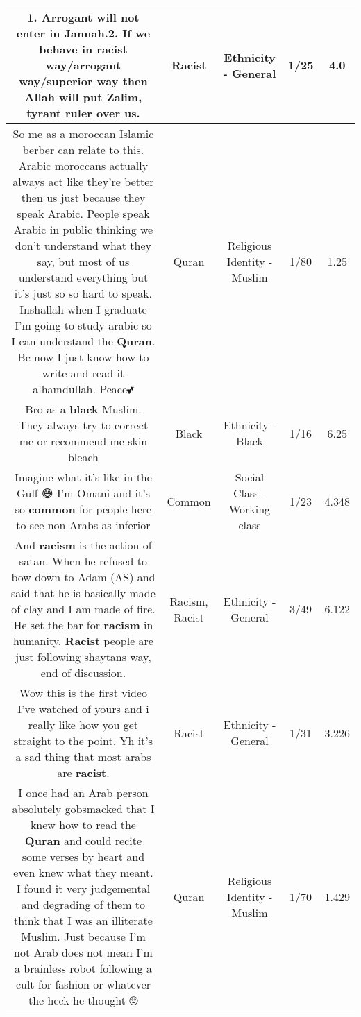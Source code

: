 \documentclass[11pt]{article}
\newlength\mylength
\begin{document}
\begin{center}
\begin{longtable}{|C{.65\mylength}|C{.30\mylength}|C{.12\mylength}|C{.12\mylength}|C{.12\mylength}|}
  \small 1. Arrogant will not enter in Jannah.2. If we behave in \textbf{racist} way/arrogant way/superior way then Allah will put Zalim, tyrant ruler over us.\normalsize   & Racist & Ethnicity - General & 1/25 & 4.0 \\  \hline
  \small So me as a moroccan Islamic berber can relate to this. Arabic moroccans actually always act like they're better then us just because they speak Arabic. People speak Arabic in public thinking we don't understand what they say, but most of us understand everything but it's just  so so hard to speak. Inshallah when I graduate I'm going to study arabic so I can understand the \textbf{Quran}. Bc now I just know how to write and read it alhamdullah. Peace💕\normalsize   & Quran & Religious Identity - Muslim & 1/80 & 1.25 \\  \hline
  \small Bro as a \textbf{black} Muslim. They always try to correct me or recommend me skin bleach\normalsize   & Black & Ethnicity - Black & 1/16 & 6.25 \\  \hline
  \small Imagine what it's like in the Gulf 😅 I'm Omani and it's so \textbf{common} for people here to see non Arabs as inferior\normalsize   & Common & Social Class - Working class & 1/23 & 4.348 \\  \hline
  \small And \textbf{racism} is the action  of satan. When he refused to bow down to Adam (AS) and said that he is basically made of clay and I am made of fire. He set the bar for \textbf{racism} in humanity. \textbf{Racist} people are just following shaytans way, end of discussion.\normalsize   & Racism, Racist & Ethnicity - General & 3/49 & 6.122 \\  \hline
  \small Wow this is the first video I've watched of yours and i really like how you get straight to the point. Yh it's a sad thing that most arabs are \textbf{racist}.\normalsize   & Racist & Ethnicity - General & 1/31 & 3.226 \\  \hline
  \small I once had an Arab person absolutely gobsmacked that I knew how to read the \textbf{Quran} and could recite some verses by heart and even knew what they meant. I found it very judgemental and degrading of them to think that I was an illiterate Muslim. Just because I'm not Arab does not mean I'm a brainless robot following a cult for fashion or whatever the heck he thought 🙄\normalsize   & Quran & Religious Identity - Muslim & 1/70 & 1.429 \\  \hline

\end{longtable}
\end{center}
\end{document}
